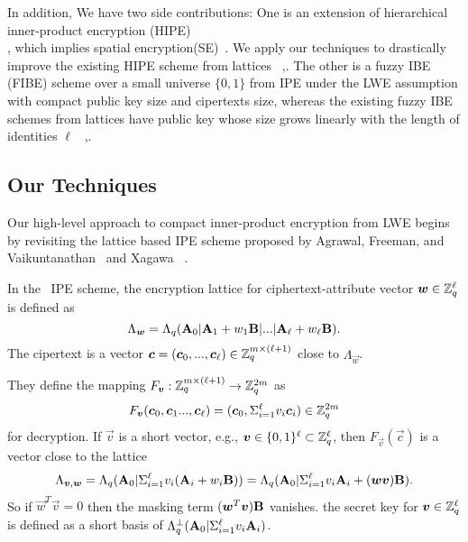 In addition, We have two side contributions: One is an extension of hierarchical inner-product encryption (HIPE)\\ \cite{AC:OkaTak09}, which implies spatial encryption(SE)~\cite{AC:BonHam08}. We apply our techniques to drastically improve the existing HIPE scheme from lattices ~\cite{LC:AbdDeCMoc12},\cite{PKC:Xagawa13}. The other is a fuzzy IBE (FIBE) scheme over a small universe $\{0,1\}$ from IPE under the LWE assumption with compact public key size and cipertexts size, whereas the existing fuzzy IBE schemes from lattices have public key whose size grows linearly with  the length of identities $\ell$~ \cite{PKC:ABVVW12},\cite{PKC:Xagawa13}.
\subsection{Our Techniques}
Our high-level approach to compact inner-product encryption from LWE begins by revisiting the lattice based IPE scheme proposed by Agrawal, Freeman, and Vaikuntanathan~ \cite{AC:AgrFreVai11} and Xagawa~ \cite{PKC:Xagawa13}.\

In the~ \cite{AC:AgrFreVai11} IPE scheme, the encryption lattice for ciphertext-attribute vector $\boldsymbol{w} \in \mathbb{Z}^{\ell}_{q}$ is defined as
$$\Lambda_{\boldsymbol{w}}=\Lambda_{q}(\mathbf{A}_{0}|\mathbf{A}_{1}+w_{1}\mathbf{B}|...|\mathbf{A}_{\ell}+w_{\ell}\mathbf{B}).$$
The cipertext is a vector $\boldsymbol{c}=(\boldsymbol{c}_{0},...,\boldsymbol{c}_{\ell}) \in \mathbb{Z}^{m \times (\ell+1)}_{q}$ close to $\Lambda_{\vec{w}}$.\

They define the mapping $F_{\boldsymbol{v}}: \mathbb{Z}^{m \times (\ell+1)}_{q} \rightarrow \mathbb{Z}^{2m}_{q}$ as
$$ F_{\boldsymbol{v}}(\boldsymbol{c}_{0},\boldsymbol{c}_{1}...,\boldsymbol{c}_{\ell})=(\boldsymbol{c}_{0},\Sigma^{\ell}_{i=1}v_{i}\boldsymbol{c}_{i})\in \mathbb{Z}^{2m}_{q}$$
for decryption. If $\vec{v}$ is a short vector, e.g., $\boldsymbol{v}\in \{0,1\}^{\ell} \subset \mathbb{Z}^{\ell}_{q}$, then $F_{\vec{v}}(\vec{c})$ is a vector close to the lattice
$$ \Lambda_{\boldsymbol{v},\boldsymbol{w}}=\Lambda_{q}(\mathbf{A}_{0}|\Sigma^{\ell}_{i=1}v_{i}(\mathbf{A}_{i}+w_{i}\mathbf{B}))=\Lambda_{q}(\mathbf{A}_{0}|\Sigma^{\ell}_{i=1}v_{i}\mathbf{A}_{i}+(\boldsymbol{w}\boldsymbol{v})\mathbf{B}). $$
So if $\vec{w}^{T}\vec{v}=0$ then the masking term $(\boldsymbol{w}^{T}\boldsymbol{v})\mathbf{B}$ vanishes. the secret key for $\boldsymbol{v}\in \mathbb{Z}^{\ell}_{q}$ is defined as a short basis of $\Lambda^{\perp}_{q}(\mathbf{A}_{0}|\Sigma^{\ell}_{i=1}v_{i}\mathbf{A}_{i})$.\

